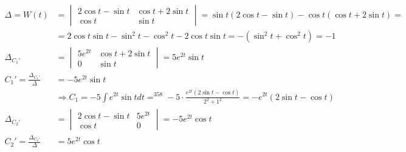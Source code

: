 \documentclass{article}
\DeclareMathOperator*{\equals}{=}
\begin{document}
\begin{align*}
    \Delta=W(t)                                  & =\begin{vmatrix}
                                                        2\cos t - \sin t & \cos t + 2 \sin t \\
                                                        \cos t           & \sin t
                                                    \end{vmatrix} = \sin t(2\cos t - \sin t)-\cos t(\cos t + 2 \sin t)=                                                              \\
                                                 & =2\cos t \sin t - \sin^2 t - \cos^2 t -2\cos t \sin t = - (\sin^2 t + \cos^2 t) = -1                                              \\
    \Delta_{C_1'}                                & = \begin{vmatrix}
                                                         5e^{2t} & \cos t + 2 \sin t \\
                                                         0       & \sin t
                                                     \end{vmatrix} = 5e^{2t}\sin t                                                                                                   \\
    C_1'           =\frac{\Delta_{C_1'}}{\Delta} & = -5e^{2t}\sin t                                                                                                                  \\
                                                 & \Rightarrow C_1=-5\int e^{2t}\sin t dt \equals^{358} -5\cdot \frac{e^{2t}(2\sin t - \cos t)}{2^2+1^2} = -e^{2t}(2\sin t - \cos t) \\
    \Delta_{C_2'}                                & = \begin{vmatrix}
                                                         2\cos t - \sin t & 5e^{2t} \\
                                                         \cos t           & 0
                                                     \end{vmatrix} = -5e^{2t}\cos t                                                                                                  \\
    C_2'           =\frac{\Delta_{C_2'}}{\Delta} & = 5e^{2t}\cos t                                                                                                                   \\

\end{align*}
\end{document}

